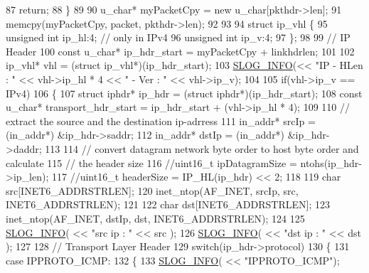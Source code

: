 \begin{DoxyCode}
{{87         \textcolor{keywordflow}{return};
88     \}
89 
90     u\_char* myPacketCpy = \textcolor{keyword}{new} u\_char[pkthdr->len];
91     memcpy(myPacketCpy, packet, pkthdr->len);
92 
93 
94     \textcolor{keyword}{struct }ip\_vhl \{
95         \textcolor{keywordtype}{unsigned} \textcolor{keywordtype}{int} ip\_hl:4; \textcolor{comment}{// only in IPv4}
96         \textcolor{keywordtype}{unsigned} \textcolor{keywordtype}{int} ip\_v:4;
97     \};  
98 
99     \textcolor{comment}{// IP Header}
100     \textcolor{keyword}{const} u\_char* ip\_hdr\_start = myPacketCpy + linkhdrlen;
101 
102     ip\_vhl* vhl = (\textcolor{keyword}{struct }ip\_vhl*)(ip\_hdr\_start);
103     \hyperlink{_logger_8h_a119c1c29ba35a8db38e2358e41167282}{SLOG\_INFO}(<< \textcolor{stringliteral}{"IP - HLen : "} << vhl->ip\_hl * 4 << \textcolor{stringliteral}{" - Ver : "} << vhl->ip\_v);
104 
105     \textcolor{keywordflow}{if}(vhl->ip\_v == IPv4)
106     \{
107         \textcolor{keyword}{struct }iphdr* ip\_hdr = (\textcolor{keyword}{struct }iphdr*)(ip\_hdr\_start);
108         \textcolor{keyword}{const} u\_char* transport\_hdr\_start = ip\_hdr\_start + (vhl->ip\_hl * 4);
109 
110         \textcolor{comment}{// extract the source and the destination ip-adrress}
111         in\_addr* srcIp = (in\_addr*) &ip\_hdr->saddr;
112         in\_addr* dstIp = (in\_addr*) &ip\_hdr->daddr;
113 
114         \textcolor{comment}{// convert datagram network byte order to host byte order and calculate}
115         \textcolor{comment}{// the header size}
116         \textcolor{comment}{//uint16\_t ipDatagramSize = ntohs(ip\_hdr->ip\_len);}
117         \textcolor{comment}{//uint16\_t headerSize     = IP\_HL(ip\_hdr) << 2;}
118 
119         \textcolor{keywordtype}{char} src[INET6\_ADDRSTRLEN];
120         inet\_ntop(AF\_INET, srcIp, src, INET6\_ADDRSTRLEN);
121 
122         \textcolor{keywordtype}{char} dst[INET6\_ADDRSTRLEN];
123         inet\_ntop(AF\_INET, dstIp, dst, INET6\_ADDRSTRLEN);
124 
125         \hyperlink{_logger_8h_a119c1c29ba35a8db38e2358e41167282}{SLOG\_INFO}( << \textcolor{stringliteral}{"src ip : "} << src );
126         \hyperlink{_logger_8h_a119c1c29ba35a8db38e2358e41167282}{SLOG\_INFO}( << \textcolor{stringliteral}{"dst ip : "} << dst );
127 
128         \textcolor{comment}{// Transport Layer Header}
129         \textcolor{keywordflow}{switch}(ip\_hdr->protocol)
130         \{
131             \textcolor{keywordflow}{case} IPPROTO\_ICMP:
132             \{
133                 \hyperlink{_logger_8h_a119c1c29ba35a8db38e2358e41167282}{SLOG\_INFO}( << \textcolor{stringliteral}{"IPPROTO\_ICMP"});
}}
\end{DoxyCode}
